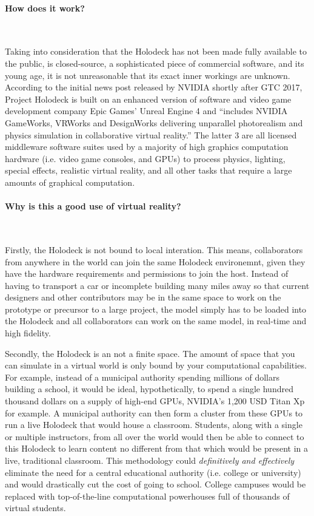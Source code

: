 \documentclass[11pt]{article}
\begin{document}
\paragraph{How does it work?} ~ \par 
Taking into consideration that the Holodeck has not been made fully available to the public, is closed-source, a sophisticated piece of commercial software, and its young age, it is not unreasonable that its exact inner workings are unknown. According to the initial news post released by NVIDIA shortly after GTC 2017, \cite{nvidiablog1} Project Holodeck is built on an enhanced version of software and video game development company Epic Games' Unreal Engine 4 and ``includes NVIDIA GameWorks, VRWorks and DesignWorks delivering unparallel photorealism and physics simulation in collaborative virtual reality.'' The latter 3 are all licensed middleware software suites used by a majority of high graphics computation hardware (i.e. video game consoles, and GPUs) to process physics, lighting, special effects, realistic virtual reality, and all other tasks that require a large amounts of graphical computation.

\paragraph{Why is this a good use of virtual reality?} ~ \par 
Firstly, the Holodeck is not bound to local interation. This means, collaborators from anywhere in the world can join the same Holodeck environemnt, given they have the hardware requirements and permissions to join the host. Instead of having to transport a car or incomplete building many miles away so that current designers and other contributors may be in the same space to work on the prototype or precursor to a large project, the model simply has to be loaded into the Holodeck and all collaborators can work on the same model, in real-time and high fidelity. 

Secondly, the Holodeck is an not a finite space. The amount of space that you can simulate in a virtual world is only bound by your computational capabilities. For example, instead of a municipal authority spending millions of dollars building a school, it would be ideal, hypothetically, to spend a single hundred thousand dollars on a supply of high-end GPUs, NVIDIA's 1,200 USD Titan Xp for example. A municipal authority can then form a cluster from these GPUs to run a live Holodeck that would house a classroom. Students, along with a single or multiple instructors, from all over the world would then be able to connect to this Holodeck to learn content no different from that which would be present in a live, traditional classroom. This methodology could \emph{definitively and effectively} eliminate the need for a central educational authority (i.e. college or university) and would drastically cut the cost of going to school. College campuses would be replaced with top-of-the-line computational powerhouses full of thousands of virtual students.
\end{document}
